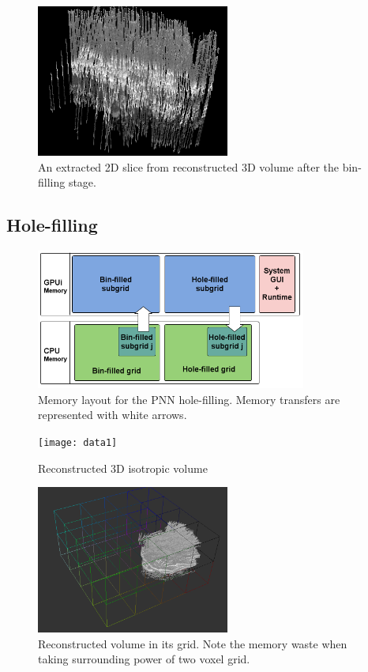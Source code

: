 \documentclass[12pt,journal,compsoc]{IEEEtran}
\begin{document}
\begin{figure}[t!]
\centering
\includegraphics[width=2.5in]{pnn_slice}%
\caption{An extracted 2D slice from reconstructed 3D volume after the bin-filling stage.}
\label{extracted_pnn_slice}
\end{figure}


\subsection{Hole-filling}

\begin{figure}[t!]
\centering
\includegraphics[width=3.5in]{hole_filling_memory}
\caption{Memory layout for the PNN hole-filling. Memory transfers are represented with white arrows.}
\label{hole_filling_memory}
\end{figure}

\begin{figure}[t!]
\centering
\texttt{[image: data1]}
\caption{Reconstructed 3D isotropic volume}
\label{reconstructed_pnn_volume}
\end{figure}

\begin{figure}[t!]
\centering
\includegraphics[width=2.5in]{split2}
\caption{Reconstructed volume in its grid. Note the memory waste when taking surrounding power of two voxel grid.}
\label{split2}
\end{figure}
\end{document}
